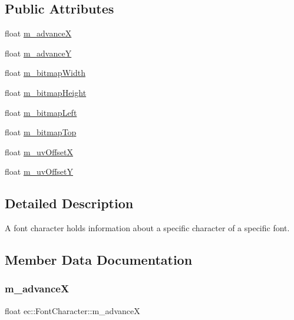 \subsection*{Public Attributes}
\begin{DoxyCompactItemize}
\item 
float \mbox{\hyperlink{structec_1_1_font_character_a3dfcbeba30562b00daf057ac7d23c762}{m\+\_\+advanceX}}
\item 
float \mbox{\hyperlink{structec_1_1_font_character_afea51e45e05b1ac9bcf351184dde2286}{m\+\_\+advanceY}}
\item 
float \mbox{\hyperlink{structec_1_1_font_character_a29e1802582b887199a7c3484f7e99b09}{m\+\_\+bitmap\+Width}}
\item 
float \mbox{\hyperlink{structec_1_1_font_character_a4ab090e6a8358c152e94a931fe651423}{m\+\_\+bitmap\+Height}}
\item 
float \mbox{\hyperlink{structec_1_1_font_character_a5f666f5036f0ddf417c1b1e3475e433c}{m\+\_\+bitmap\+Left}}
\item 
float \mbox{\hyperlink{structec_1_1_font_character_a1555f3f60ade4c5a6a22f73d68710958}{m\+\_\+bitmap\+Top}}
\item 
float \mbox{\hyperlink{structec_1_1_font_character_a13e3f7cbc190b61581c6909bff262133}{m\+\_\+uv\+OffsetX}}
\item 
float \mbox{\hyperlink{structec_1_1_font_character_ac48d060931b82412610d9749b1374db3}{m\+\_\+uv\+OffsetY}}
\end{DoxyCompactItemize}


\subsection{Detailed Description}
A font character holds information about a specific character of a specific font. 

\subsection{Member Data Documentation}
\mbox{\label{structec_1_1_font_character_a3dfcbeba30562b00daf057ac7d23c762}} 
\subsubsection{\texorpdfstring{m\+\_\+advanceX}{m\_advanceX}}
{\footnotesize\ttfamily float ec\+::\+Font\+Character\+::m\+\_\+advanceX}

